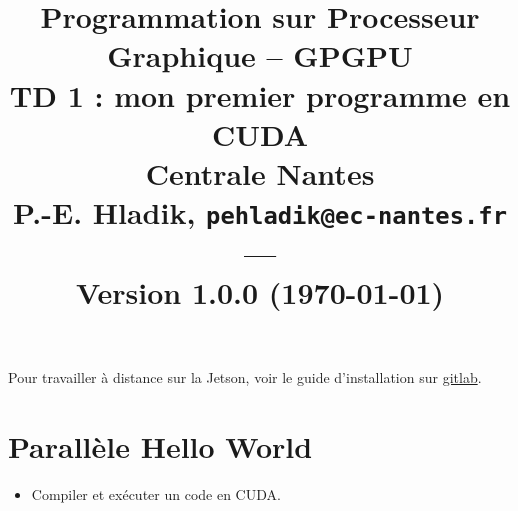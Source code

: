 

\title{{\Large Programmation sur Processeur Graphique -- GPGPU }\\
\vspace{-0.4em}
{\large TD 1 : mon premier programme en CUDA}\\
{\small Centrale Nantes}\\
\small P.-E. Hladik, \small{\texttt{pehladik@ec-nantes.fr}}\\
---\\
{\scriptsize  Version 1.0.0 (\today)}\\
}



\maketitle


\begin{ad}[]{}
 \begin{itemize}
 	Pour travailler à distance sur la Jetson, voir le guide d'installation sur \href{https://gitlab.univ-nantes.fr/hladik-pe-1/ecn-gpu-cours/-/blob/main/HowTo/Hwt1-remote/GPGPU_Hwt_remote.pdf?ref_type=heads}{gitlab}.
\end{itemize}
\end{ad}


  \section{Parallèle Hello World}

\begin{objectif}[]{}
 \begin{itemize}
	\item Compiler et exécuter un code en CUDA.
\end{itemize}
\end{objectif}


